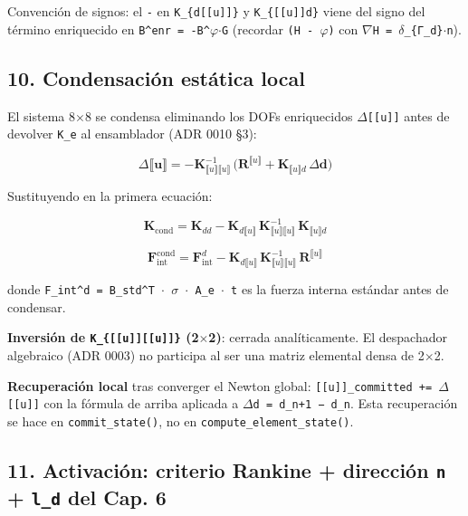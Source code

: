 \documentclass[11pt,letterpaper,oneside]{report}
\begin{document}
Convención de signos: el \texttt{-} en \texttt{K\_\{d[[u]]\}} y \texttt{K\_\{[[u]]d\}} viene del signo del término enriquecido en \texttt{B\textasciicircum{}enr = -B\textasciicircum{}\ensuremath{\varphi}\ensuremath{\cdot}G} (recordar \texttt{(H - \ensuremath{\varphi})} con \texttt{\ensuremath{\nabla}H = \ensuremath{\delta}\_\{Γ\_d\}\ensuremath{\cdot}n}).

\subsection{10. Condensación estática local}

El sistema 8\ensuremath{\times}8 se condensa eliminando los DOFs enriquecidos \texttt{\ensuremath{\Delta}[[u]]} antes de devolver \texttt{K\_e} al ensamblador (ADR 0010 §3):

\[
\Delta\llbracket\mathbf u\rrbracket = -\mathbf K_{\llbracket u\rrbracket\llbracket u\rrbracket}^{-1}\,\bigl(\mathbf R^{\llbracket u\rrbracket} + \mathbf K_{\llbracket u\rrbracket d}\,\Delta\mathbf d\bigr)
\]

Sustituyendo en la primera ecuación:

\[
\boxed{\;\mathbf K_{\text{cond}} = \mathbf K_{dd} - \mathbf K_{d\llbracket u\rrbracket}\,\mathbf K_{\llbracket u\rrbracket\llbracket u\rrbracket}^{-1}\,\mathbf K_{\llbracket u\rrbracket d}\;}
\]

\[
\boxed{\;\mathbf F_{\text{int}}^{\text{cond}} = \mathbf F_{\text{int}}^d - \mathbf K_{d\llbracket u\rrbracket}\,\mathbf K_{\llbracket u\rrbracket\llbracket u\rrbracket}^{-1}\,\mathbf R^{\llbracket u\rrbracket}\;}
\]

donde \texttt{F\_int\textasciicircum{}d = B\_std\textasciicircum{}T \ensuremath{\cdot} \ensuremath{\sigma} \ensuremath{\cdot} A\_e \ensuremath{\cdot} t} es la fuerza interna estándar antes de condensar.

\textbf{Inversión de \texttt{K\_\{[[u]][[u]]\}} (2\ensuremath{\times}2)}: cerrada analíticamente. El despachador algebraico (ADR 0003) no participa al ser una matriz elemental densa de 2\ensuremath{\times}2.

\textbf{Recuperación local} tras converger el Newton global: \texttt{[[u]]\_committed += \ensuremath{\Delta}[[u]]} con la fórmula de arriba aplicada a \texttt{\ensuremath{\Delta}d = d\_n+1 − d\_n}. Esta recuperación se hace en \texttt{commit\_state()}, no en \texttt{compute\_element\_state()}.

\subsection{11. Activación: criterio Rankine + dirección \texttt{n} + \texttt{l\_d} del Cap. 6}
\end{document}
